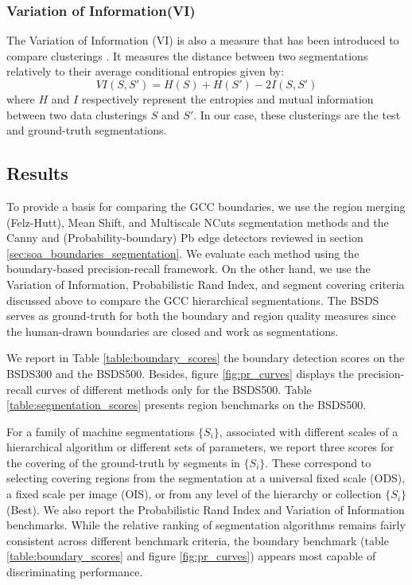 \subsubsection{Variation of Information(VI)}
The Variation of Information (VI) is also a measure that has been introduced to compare clusterings \citep{Meila:LTKM:2003}. It measures the distance between two segmentations relatively to their average conditional entropies given by:
\begin{equation}
	VI(S, S') = H(S) + H(S') - 2I(S, S')
\end{equation}
where $H$ and $I$ respectively represent the entropies and mutual information between two data clusterings $S$ and $S'$. In our case, these clusterings are the test and ground-truth segmentations.


\subsection{Results}
To provide a basis for comparing the GCC boundaries, we use the region merging (Felz-Hutt), Mean Shift, and Multiscale NCuts segmentation methods and the Canny and (Probability-boundary) Pb edge detectors reviewed in section \ref{sec:soa_boundaries_segmentation}. We evaluate each method using the boundary-based precision-recall framework. On the other hand, we use the Variation of Information, Probabilistic Rand Index, and segment covering criteria discussed above to compare the GCC hierarchical segmentations. The BSDS serves as ground-truth for both the boundary and region quality measures since the human-drawn boundaries are closed and work as segmentations.

We report in Table \ref{table:boundary_scores} the boundary detection scores on the BSDS300 and the BSDS500. Besides, figure \ref{fig:pr_curves} displays the precision-recall curves of different methods only for the BSDS500. Table \ref{table:segmentation_scores} presents region benchmarks on the BSDS500. 

For a family of machine segmentations $\{S_i\}$, associated with different scales of a hierarchical algorithm or different sets of parameters, we report three scores for the covering of the ground-truth by segments in $\{S_i\}$. These correspond to selecting covering regions from the segmentation at a universal fixed scale (ODS), a fixed scale per image (OIS), or from any level of the hierarchy or collection $\{S_i\}$ (Best). We also report the Probabilistic Rand Index and Variation of Information benchmarks. While the relative ranking of segmentation algorithms remains fairly consistent across different benchmark criteria, the boundary benchmark (table \ref{table:boundary_scores} and figure \ref{fig:pr_curves}) appears most capable of discriminating performance.

